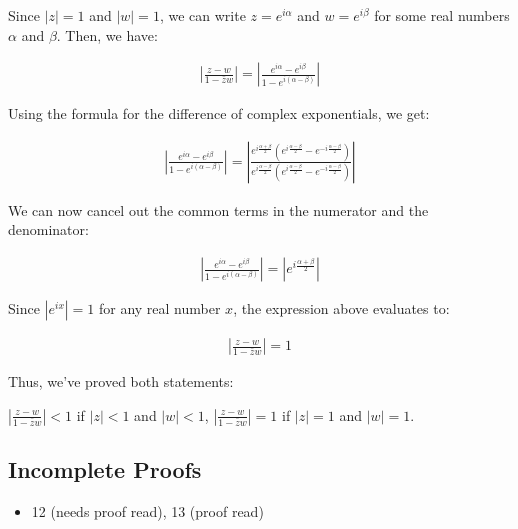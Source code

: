 \begin{enumerate}
	      Since $|z| = 1$ and $|w| = 1$, we can write $z = e^{i\alpha}$ and $w = e^{i\beta}$
	      for some real numbers $\alpha$ and $\beta$. Then, we have:

	      \begin{align*}
		      \left|\frac{z - w}{1 - \bar{z}w}\right|
		      = \left|\frac{e^{i\alpha} - e^{i\beta}}{1 - e^{i(\alpha - \beta)}}\right|
	      \end{align*}

	      Using the formula for the difference of complex exponentials, we get:

	      \begin{align*}
		      \left|\frac{e^{i\alpha} - e^{i\beta}}{1 - e^{i(\alpha - \beta)}}\right|
		      = \left|\frac{e^{i\frac{\alpha + \beta}{2}}(e^{i\frac{\alpha - \beta}{2}}
			      - e^{-i\frac{\alpha - \beta}{2}})}{e^{i\frac{\alpha - \beta}{2}}
			      (e^{i\frac{\alpha - \beta}{2}} - e^{-i\frac{\alpha - \beta}{2}})}\right|
	      \end{align*}

	      We can now cancel out the common terms in the numerator and the denominator:

	      \begin{align*}
		      \left|\frac{e^{i\alpha} - e^{i\beta}}{1 - e^{i(\alpha - \beta)}}\right|
		      = \left|e^{i\frac{\alpha + \beta}{2}}\right|
	      \end{align*}

	      Since $|e^{ix}| = 1$ for any real number $x$, the expression above evaluates to:

	      \begin{align*}
		      \left|\frac{z - w}{1 - \bar{z}w}\right| = 1
	      \end{align*}

	      Thus, we've proved both statements:

	      $\left|\frac{z - w}{1 - \bar{z}w}\right| < 1$ if $|z| < 1$ and $|w| < 1$,
	      $\left|\frac{z - w}{1 - \bar{z}w}\right| = 1$ if $|z| = 1$ and $|w| = 1$.

\end{enumerate}

\subsection{Incomplete Proofs}
\begin{itemize}
	\item 12 (needs proof read), 13 (proof read)
\end{itemize}
\newpage